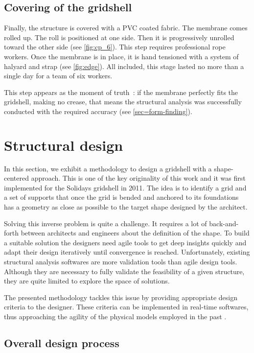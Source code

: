 \subsection{Covering of the gridshell}
Finally, the structure is covered with a PVC coated fabric. The membrane comes rolled up. The roll is positioned at one side. Then it is progressively unrolled toward the other side (see \cref{fig:cp_6}). This step requires professional rope workers. Once the membrane is in place, it is hand tensioned with a system of halyard and strap (see \cref{fig:edge}). All included, this stage lasted no more than a single day for a team of six workers.

This step appears as the moment of truth~: if the membrane perfectly fits the gridshell, making no crease, that means the structural analysis was successfully conducted with the required accuracy (see \cref{sec=form-finding}).

\section{Structural design}\label{sec=proj_design}

In this section, we exhibit a methodology to design a gridshell with a shape-centered approach. This is one of the key originality of this work and it was first implemented for the Solidays gridshell in 2011. The idea is to identify a grid and a set of supports that once the grid is bended and anchored to its foundations has a geometry as close as possible to the target shape designed by the architect.

Solving this inverse problem is quite a challenge. It requires a lot of back-and-forth between architects and engineers about the definition of the shape. To build a suitable solution the designers need agile tools to get deep insights quickly and adapt their design iteratively until convergence is reached. Unfortunately, existing structural analysis softwares are more validation tools than agile design tools. Although they are necessary to fully validate the feasibility of a given structure, they are quite limited to explore the space of solutions.

The presented methodology tackles this issue by providing appropriate design criteria to the designer. These criteria can be implemented in real-time softwares, thus approaching the agility of the physical models employed in the past \cite{Addis2013}.

\subsection{Overall design process}

